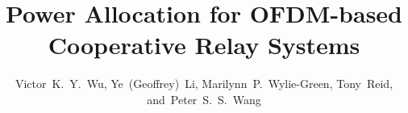 \documentclass[journal]{IEEEtran}
\begin{document}
\title{Power Allocation for OFDM-based Cooperative Relay Systems}




\author{Victor~K.~Y.~Wu,
        Ye~(Geoffrey)~Li,
        Marilynn~P.~Wylie-Green,
        Tony~Reid,
        and~Peter~S.~S.~Wang}

\maketitle
\end{document}
